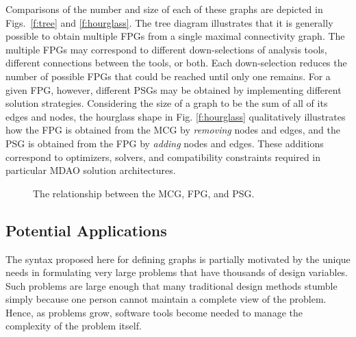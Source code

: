   Comparisons of the number and size of each of these graphs are depicted in Figs.~\ref{f:tree} and \ref{f:hourglass}. 
  The tree diagram illustrates that it is generally possible to obtain 
  multiple FPGs from a single maximal connectivity graph. The multiple FPGs may correspond to 
  different down-selections of analysis tools, different connections between the tools, 
  or both. Each down-selection reduces the number of possible FPGs that could be reached 
  until only one remains. For a given FPG, however, different PSGs may be obtained by implementing 
  different solution strategies. Considering the size of a graph to be the sum of all of its
  edges and nodes, the hourglass shape in Fig. \ref{f:hourglass} qualitatively illustrates how
  the FPG is obtained from the MCG by \emph{removing} nodes and edges, 
  and the PSG is obtained from the FPG by \emph{adding} nodes and edges.
These additions correspond to optimizers, solvers, and compatibility constraints required in particular MDAO solution architectures.
\begin{figure}[htb!]
    \centering
  \caption{The relationship between the MCG, FPG, and PSG.}
  \end{figure}

\subsection{Potential Applications}

The syntax proposed here for defining graphs is partially motivated by the unique needs
in formulating very large problems that have thousands of design variables. Such problems are 
large enough that many traditional design methods stumble simply because one person cannot maintain a complete view of the problem. Hence, as problems 
grow, software tools become needed to manage the complexity of the problem itself. 

